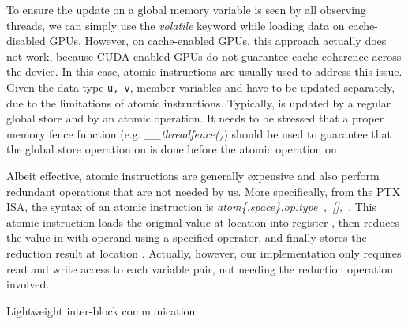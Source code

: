 \documentclass[article]{elsarticle}
\begin{document}
{To ensure the update on a global memory variable is seen by all observing threads, we can simply use the \textit{volatile} keyword while loading data on cache-disabled GPUs. However, on cache-enabled GPUs, this approach actually does not work, because CUDA-enabled GPUs do not guarantee cache coherence across the device. In this case, atomic instructions are usually used to address this issue. Given the data type \hbox{{\tt u, v}}, member variables  and  have to be updated separately, due to the limitations of atomic instructions. Typically,  is updated by a regular global store and  by an atomic operation. It needs to be stressed that a proper memory fence function (e.g. \textit{\_\_threadfence()}) should be used to guarantee that the global store operation on  is done before the atomic operation on  \cite{cudacprogramming}.

Albeit effective, atomic instructions are generally expensive and also perform redundant operations that are not needed by us. More specifically, from the PTX ISA, the syntax of an atomic instruction is \textit{atom\{.space\}.op.type~,~[],~}. This atomic instruction loads the original value at location  into register , then reduces the value in  with operand  using a specified operator, and finally stores the reduction result at location . Actually, however, our implementation only requires read and write access to each variable pair, not needing the reduction operation involved.
\begin{algorithm}[!h]
\caption{Lightweight inter-block communication}
\label{alg:block_comm}
\fontsize{8pt}{8.05pt}\selectfont
\begin{algorithmic}[1]
    
    


    
    
\EndFunction
\end{algorithmic}

\begin{algorithmic}[1]
    
    

\end{algorithmic}
\end{algorithm}}
\end{document}
